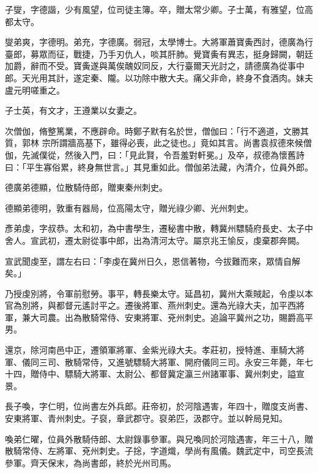 \begin{pinyinscope}
 子燮，字德諧，少有風望，位司徒主簿。卒，贈太常少卿。子士萬，有雅望，位高都太守。



 燮弟爽，字德明。弟充，字德廣。弱冠，太學博士。大將軍蕭寶夤西討，德廣為行臺郎，募眾而征，戰捷，乃手刃仇人，啖其肝肺。覺寶夤有異志，挺身歸闕，朝廷加爵，辭而不受。寶夤遂與萬俟醜奴同反，大行臺爾天光討之，請德廣為從事中郎。天光用其計，遂定秦、隴。以功除中散大夫。痛父非命，終身不食酒肉。妹夫盧元明嗟重之。



 子士英，有文才，王遵業以女妻之。



 次僧伽，脩整篤業，不應辟命。時鄭子默有名於世，僧伽曰：「行不適道，文勝其質，郭林
 宗所謂牆高基下，雖得必喪，此之徒也。」竟如其言。尚書袁叔德來候僧伽，先滅僕從，然後入門，曰：「見此賢，令吾羞對軒冕。」及卒，叔德為懷舊詩曰：「平生寡俗累，終身無世言。」其見重如此。僧伽弟法藏，內清介，位員外郎。



 德廣弟德顯，位散騎侍郎，贈東秦州刺史。



 德顯弟德明，敦重有器局，位高陽太守，贈光祿少卿、光州刺史。



 彥弟虔，字叔恭。太和初，為中書學生，遷秘書中散，轉冀州驃騎府長史、太子中舍人。宣武初，遷太尉從事中郎，出為清河太守。屬京兆王愉反，虔棄郡奔闕。



 宣武聞虔至，謂左右曰：「李虔在冀州日久，恩信著物，今拔難而來，眾情自解
 矣。」



 乃授虔別將，令軍前慰勞。事平，轉長樂太守。延昌初，冀州大乘賊起，令虔以本官為別將，與都督元遙討平之。遷後將軍、燕州刺史。還為光祿大夫，加平西將軍，兼大司農。出為散騎常侍、安東將軍、兗州刺史。追論平冀州之功，賜爵高平男。



 還京，除河南邑中正，遷領軍將軍、金紫光祿大夫。孝莊初，授特進、車騎大將軍、儀同三司、散騎常侍，又進號驃騎大將軍、開府儀同三司。永安三年薨，年七十四，贈侍中、驃騎大將軍、太尉公、都督冀定瀛三州諸軍事、冀州刺史，謚宣景。



 長子喚，字仁明，位尚書左外兵郎。莊帝初，於河陰遇害，年四十，贈度支尚書、
 安東將軍、青州刺史。子裒，章武郡守。裒弟匹，汲郡守。並以幹局見知。



 喚弟仁曜，位員外散騎侍郎、太尉錄事參軍。與兄喚同於河陰遇害，年三十八，贈散騎常侍、左將軍、兗州刺史。子捴，字道熾，學尚有風儀。魏武定中，司空長流參軍。齊天保末，為尚書郎，終於光州司馬。




\end{pinyinscope}
